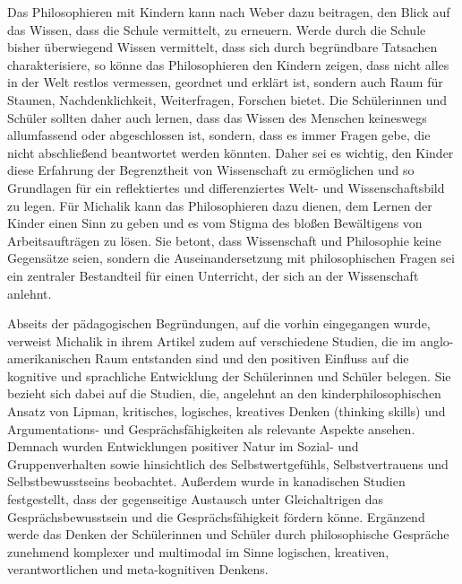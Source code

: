 Das Philosophieren mit Kindern kann nach Weber dazu beitragen, den Blick auf das Wissen, dass die Schule vermittelt, zu erneuern.
Werde durch die Schule bisher überwiegend Wissen vermittelt, dass sich durch begründbare Tatsachen charakterisiere, so könne das Philosophieren den Kindern zeigen, dass nicht alles in der Welt \glqq restlos vermessen, geordnet und erklärt ist, sondern auch Raum für Staunen, Nachdenklichkeit, Weiterfragen, Forschen bietet.\grqq{}\cite[S.\,639]{KM13}
Die Schülerinnen und Schüler sollten daher auch lernen, dass das Wissen des Menschen keineswegs allumfassend oder abgeschlossen ist, sondern, dass es immer Fragen gebe, die nicht abschließend beantwortet werden könnten.
Daher sei es wichtig, den Kinder diese Erfahrung der Begrenztheit von Wissenschaft zu ermöglichen und so \glqq Grundlagen für ein reflektiertes und differenziertes Welt- und Wissenschaftsbild zu legen.\grqq{}\cite[S.\,640]{KM13}
Für Michalik kann das Philosophieren dazu dienen, dem Lernen der Kinder einen Sinn zu geben und es vom Stigma des bloßen Bewältigens von Arbeitsaufträgen zu lösen.
Sie betont, dass Wissenschaft und Philosophie keine Gegensätze seien, sondern die Auseinandersetzung mit philosophischen Fragen sei ein zentraler Bestandteil für einen Unterricht, der sich an der Wissenschaft anlehnt.
  
Abseits der pädagogischen Begründungen, auf die vorhin eingegangen wurde, verweist Michalik in ihrem Artikel zudem auf verschiedene Studien, die im anglo-amerikanischen Raum entstanden sind und den positiven Einfluss auf die kognitive und sprachliche Entwicklung der Schülerinnen und Schüler belegen. 
Sie bezieht sich dabei auf die Studien, die, angelehnt an den kinderphilosophischen Ansatz von Lipman, \glqq kritisches, logisches, kreatives Denken (thinking skills) und Argumentations- und Gesprächsfähigkeiten\grqq{}\cite[S.\,643]{KM13} als relevante Aspekte ansehen. 
Demnach wurden Entwicklungen positiver Natur im Sozial- und Gruppenverhalten sowie hinsichtlich des Selbstwertgefühls, Selbstvertrauens und Selbstbewusstseins beobachtet.
Außerdem wurde in kanadischen Studien festgestellt, dass der gegenseitige Austausch unter Gleichaltrigen das Gesprächsbewusstsein und die Gesprächsfähigkeit fördern könne. 
Ergänzend werde das Denken der Schülerinnen und Schüler durch philosophische Gespräche \glqq zunehmend komplexer und multimodal im Sinne logischen, kreativen, verantwortlichen und meta-kognitiven Denkens.\grqq{}\cite[S.\,643]{KM13}

